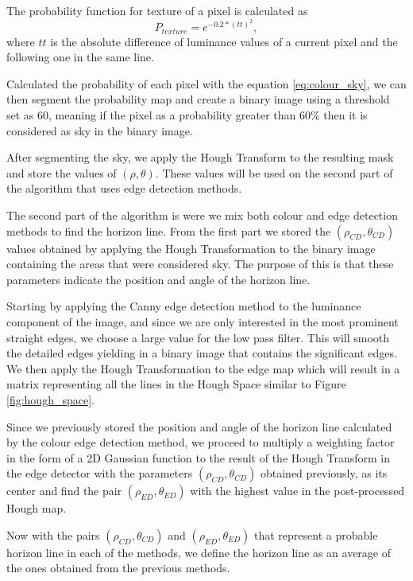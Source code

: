 The probability function for texture of a pixel is calculated as
\begin{equation}
	P_{texture} = e^{-0.2*(tt)^{2}},
\end{equation}
where $tt$ is the absolute difference of luminance values of a current pixel and the following one in the same line.

Calculated the probability of each pixel with the equation \ref{eq:colour_sky}, we can then segment the probability map and create a binary image using a threshold set as 60, meaning if the pixel as a probability greater than 60\% then it is considered as sky in the binary image.

After segmenting the sky, we apply the Hough Transform to the resulting mask and store the values of $(\rho,\theta)$. These values will be used on the second part of the algorithm that uses edge detection methods.

The second part of the algorithm is were we mix both colour and edge detection methods to find the horizon line. From the first part we stored the $(\rho_{CD},\theta_{CD})$ values obtained by applying the Hough Transformation to the binary image containing the areas that were considered sky. The purpose of this is that these parameters indicate the position and angle of the horizon line.

Starting by applying the Canny edge detection method to the luminance component of the image, and since we are only interested in the most prominent straight edges, we choose a large value for the low pass filter. This will smooth the detailed edges yielding in a binary image that contains the significant edges. We then apply the Hough Transformation to the edge map which will result in a matrix representing all the lines in the Hough Space similar to Figure \ref{fig:hough_space}.

Since we previously stored the position and angle of the horizon line calculated by the colour edge detection method, we proceed to multiply a weighting factor in the form of a 2D Gaussian function to the result of the Hough Transform in the edge detector with the parameters $(\rho_{CD},\theta_{CD})$ obtained previously, as its center and find the pair $(\rho_{ED}, \theta_{ED})$ with the highest value in the post-processed Hough map.

Now with the pairs $(\rho_{CD}, \theta_{CD})$ and $(\rho_{ED}, \theta_{ED})$ that represent a probable horizon line in each of the methods, we define the horizon line as an average of the ones obtained from the previous methods.

